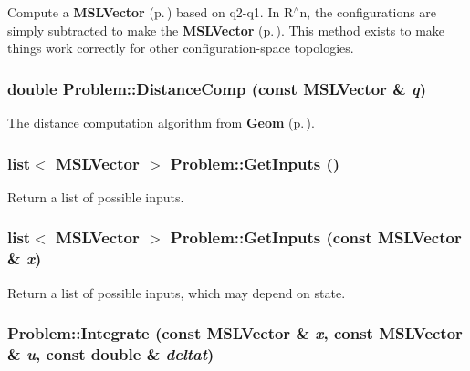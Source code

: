 Compute a {\bf MSLVector} {\rm (p.\,\pageref{classMSLVector})} based on q2-q1. In R$^\wedge$n, the configurations are simply subtracted to make the {\bf MSLVector} {\rm (p.\,\pageref{classMSLVector})}. This method exists to make things work correctly for other configuration-space topologies.

\subsubsection{\setlength{\rightskip}{0pt plus 5cm}double Problem::Distance\-Comp (const {\bf MSLVector} \& {\em q})\hspace{0.3cm}{\tt  [virtual]}}\label{classProblem_a13}


The distance computation algorithm from {\bf Geom} {\rm (p.\,\pageref{classGeom})}.

\subsubsection{\setlength{\rightskip}{0pt plus 5cm}list$<$ {\bf MSLVector} $>$ Problem::Get\-Inputs ()\hspace{0.3cm}{\tt  [virtual]}}\label{classProblem_a5}


Return a list of possible inputs.

\subsubsection{\setlength{\rightskip}{0pt plus 5cm}list$<$ {\bf MSLVector} $>$ Problem::Get\-Inputs (const {\bf MSLVector} \& {\em x})\hspace{0.3cm}{\tt  [virtual]}}\label{classProblem_a4}


Return a list of possible inputs, which may depend on state.

\subsubsection{ Problem::Integrate (const {\bf MSLVector} \& {\em x}, const {\bf MSLVector} \& {\em u}, const double \& {\em deltat})\hspace{0.3cm}{\tt  [virtual]}}\label{classProblem_a6}


